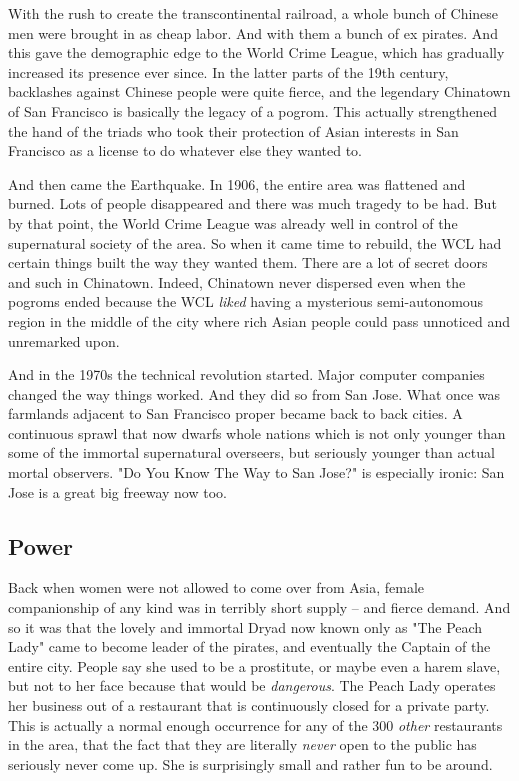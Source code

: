 With the rush to create the transcontinental railroad, a whole bunch of Chinese men were brought in as cheap labor. And with them a bunch of ex pirates. And this gave the demographic edge to the World Crime League, which has gradually increased its presence ever since. In the latter parts of the 19th century, backlashes against Chinese people were quite fierce, and the legendary Chinatown of San Francisco is basically the legacy of a pogrom. This actually strengthened the hand of the triads who took their protection of Asian interests in San Francisco as a license to do whatever else they wanted to.

And then came the Earthquake. In 1906, the entire area was flattened and burned. Lots of people disappeared and there was much tragedy to be had. But by that point, the World Crime League was already well in control of the supernatural society of the area. So when it came time to rebuild, the WCL had certain things built the way they wanted them. There are a lot of secret doors and such in Chinatown. Indeed, Chinatown never dispersed even when the pogroms ended because the WCL \textit{liked} having a mysterious semi-autonomous region in the middle of the city where rich Asian people could pass unnoticed and unremarked upon.

And in the 1970s the technical revolution started. Major computer companies changed the way things worked. And they did so from San Jose. What once was farmlands adjacent to San Francisco proper became back to back cities. A continuous sprawl that now dwarfs whole nations which is not only younger than some of the immortal supernatural overseers, but seriously younger than actual mortal observers. "Do You Know The Way to San Jose?" is especially ironic: San Jose is a great big freeway now too.

\subsection{Power}

\hspace{\parindent} Back when women were not allowed to come over from Asia, female companionship of any kind was in terribly short supply -- and fierce demand. And so it was that the lovely and immortal Dryad now known only as "The Peach Lady" came to become leader of the pirates, and eventually the Captain of the entire city. People say she used to be a prostitute, or maybe even a harem slave, but not to her face because that would be \textit{dangerous}. The Peach Lady operates her business out of a restaurant that is continuously closed for a private party. This is actually a normal enough occurrence for any of the 300 \textit{other} restaurants in the area, that the fact that they are literally \textit{never} open to the public has seriously never come up. She is surprisingly small and rather fun to be around. 


